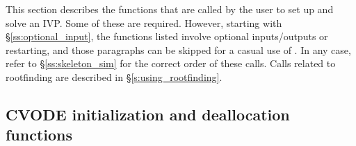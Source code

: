 This section describes the {\cvode} functions that are called by the
user to set up and solve an IVP. Some of these are required. However,
starting with \S\ref{ss:optional_input}, the functions listed involve
optional inputs/outputs or restarting, and those paragraphs can be
skipped for a casual use of {\cvode}. In any case, refer to
\S\ref{ss:skeleton_sim} for the correct order of these calls.
Calls related to rootfinding are described in \S\ref{s:using_rootfinding}.

\subsection{CVODE initialization and deallocation functions}
\label{sss:cvodemalloc}

